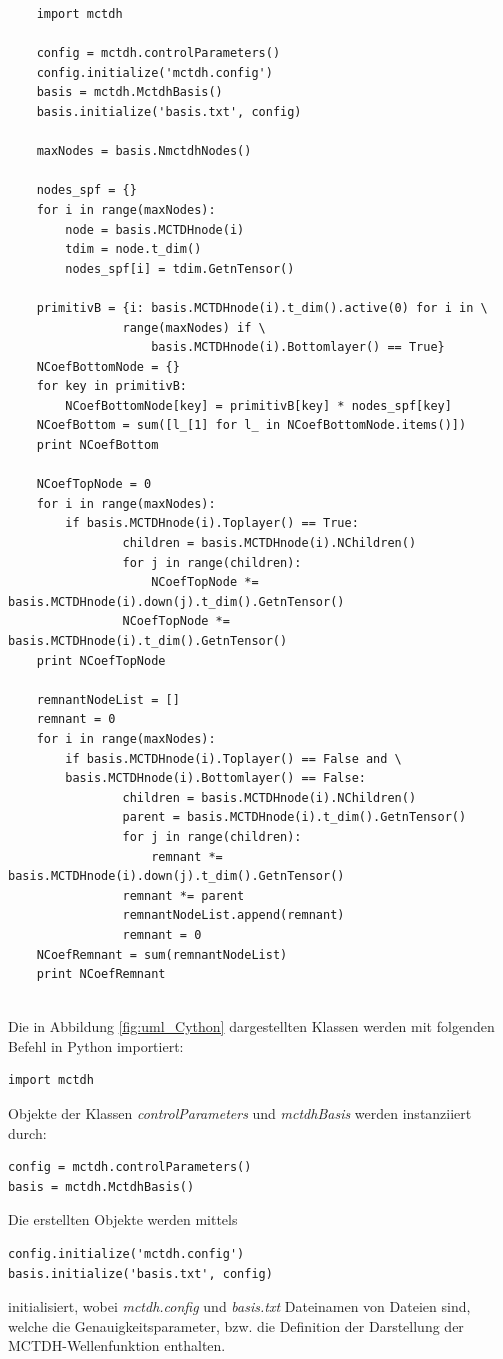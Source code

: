 \begin{verbatim}
    import mctdh

    config = mctdh.controlParameters()
    config.initialize('mctdh.config')
    basis = mctdh.MctdhBasis()
    basis.initialize('basis.txt', config)
    
    maxNodes = basis.NmctdhNodes()
    
    nodes_spf = {}
    for i in range(maxNodes):
        node = basis.MCTDHnode(i)
        tdim = node.t_dim()
        nodes_spf[i] = tdim.GetnTensor() 
    
    primitivB = {i: basis.MCTDHnode(i).t_dim().active(0) for i in \
                range(maxNodes) if \
                    basis.MCTDHnode(i).Bottomlayer() == True}
    NCoefBottomNode = {}
    for key in primitivB:
        NCoefBottomNode[key] = primitivB[key] * nodes_spf[key]
    NCoefBottom = sum([l_[1] for l_ in NCoefBottomNode.items()])
    print NCoefBottom

    NCoefTopNode = 0
    for i in range(maxNodes):
        if basis.MCTDHnode(i).Toplayer() == True:
                children = basis.MCTDHnode(i).NChildren()
                for j in range(children):
                    NCoefTopNode *= basis.MCTDHnode(i).down(j).t_dim().GetnTensor()
                NCoefTopNode *= basis.MCTDHnode(i).t_dim().GetnTensor()
    print NCoefTopNode
    
    remnantNodeList = []
    remnant = 0
    for i in range(maxNodes):
        if basis.MCTDHnode(i).Toplayer() == False and \
        basis.MCTDHnode(i).Bottomlayer() == False:
                children = basis.MCTDHnode(i).NChildren()
                parent = basis.MCTDHnode(i).t_dim().GetnTensor()
                for j in range(children):
                    remnant *= basis.MCTDHnode(i).down(j).t_dim().GetnTensor() 
                remnant *= parent
                remnantNodeList.append(remnant)
                remnant = 0
    NCoefRemnant = sum(remnantNodeList)
    print NCoefRemnant
    
\end{verbatim}

Die in Abbildung \ref{fig:uml_Cython} dargestellten Klassen werden mit folgenden Befehl in Python importiert:

\begin{verbatim}
import mctdh
\end{verbatim}
Objekte der Klassen \textit{controlParameters} und \textit{mctdhBasis} werden instanziiert durch:
\begin{verbatim}
config = mctdh.controlParameters()
basis = mctdh.MctdhBasis()
\end{verbatim}
Die erstellten Objekte werden mittels
\begin{verbatim}
config.initialize('mctdh.config')
basis.initialize('basis.txt', config)
\end{verbatim}
initialisiert, wobei \textit{mctdh.config} und \textit{basis.txt} Dateinamen von Dateien sind, 
welche die Genauigkeitsparameter, bzw. die Definition der Darstellung der MCTDH-Wellenfunktion enthalten.

